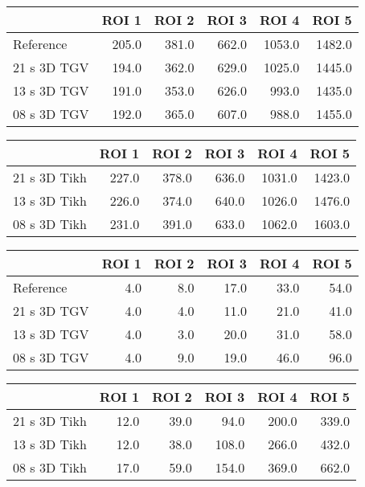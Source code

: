 \begin{tabular}{lrrrrr}
\toprule
{} &  ROI 1 &  ROI 2 &  ROI 3 &   ROI 4 &   ROI 5 \\
\midrule
Reference   &  205.0 &  381.0 &  662.0 &  1053.0 &  1482.0 \\
21 s 3D TGV &  194.0 &  362.0 &  629.0 &  1025.0 &  1445.0 \\
13 s 3D TGV &  191.0 &  353.0 &  626.0 &   993.0 &  1435.0 \\
08 s 3D TGV &  192.0 &  365.0 &  607.0 &   988.0 &  1455.0 \\
\bottomrule
\end{tabular}
\begin{tabular}{lrrrrr}
\toprule
{} &  ROI 1 &  ROI 2 &  ROI 3 &   ROI 4 &   ROI 5 \\
\midrule
21 s 3D Tikh &  227.0 &  378.0 &  636.0 &  1031.0 &  1423.0 \\
13 s 3D Tikh &  226.0 &  374.0 &  640.0 &  1026.0 &  1476.0 \\
08 s 3D Tikh &  231.0 &  391.0 &  633.0 &  1062.0 &  1603.0 \\
\bottomrule
\end{tabular}
\begin{tabular}{lrrrrr}
\toprule
{} &  ROI 1 &  ROI 2 &  ROI 3 &  ROI 4 &  ROI 5 \\
\midrule
Reference   &    4.0 &    8.0 &   17.0 &   33.0 &   54.0 \\
21 s 3D TGV &    4.0 &    4.0 &   11.0 &   21.0 &   41.0 \\
13 s 3D TGV &    4.0 &    3.0 &   20.0 &   31.0 &   58.0 \\
08 s 3D TGV &    4.0 &    9.0 &   19.0 &   46.0 &   96.0 \\
\bottomrule
\end{tabular}
\begin{tabular}{lrrrrr}
\toprule
{} &  ROI 1 &  ROI 2 &  ROI 3 &  ROI 4 &  ROI 5 \\
\midrule
21 s 3D Tikh &   12.0 &   39.0 &   94.0 &  200.0 &  339.0 \\
13 s 3D Tikh &   12.0 &   38.0 &  108.0 &  266.0 &  432.0 \\
08 s 3D Tikh &   17.0 &   59.0 &  154.0 &  369.0 &  662.0 \\
\bottomrule
\end{tabular}
